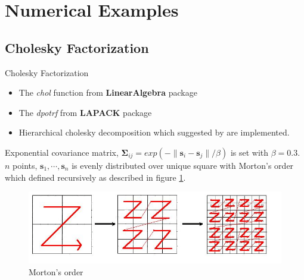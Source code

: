 \section{Numerical Examples}

\subsection{Cholesky Factorization}

\begin{frame}{Cholesky Factorization}
\footnotesize

\begin{itemize}
	\item The \textit{chol} function from \textbf{LinearAlgebra} package
	\item The \textit{dpotrf} from \textbf{LAPACK} package
	\item Hierarchical cholesky decomposition which suggested by \citet{hackbusch2015hierarchical} are implemented. 
\end{itemize}
	
Exponential covariance matrix, $\boldsymbol{\Sigma}_{ij}=exp(-\lVert \mathbf{s}_i-\mathbf{s}_j \rVert/\beta)$ is set with $\beta=0.3$. $n$ points, $\mathbf{s}_1,\cdots,\mathbf{s}_n$ is evenly distributed over unique square with Morton's order which defined recursively as described in figure \ref{fig:morton}.

\begin{figure}[h]
	\centering
	\includegraphics[width=.5\linewidth]{figs/Morton.jpg}
	\caption{Morton's order\citep{salem2016comparative}}
	\label{fig:morton}
\end{figure}
\end{frame}

